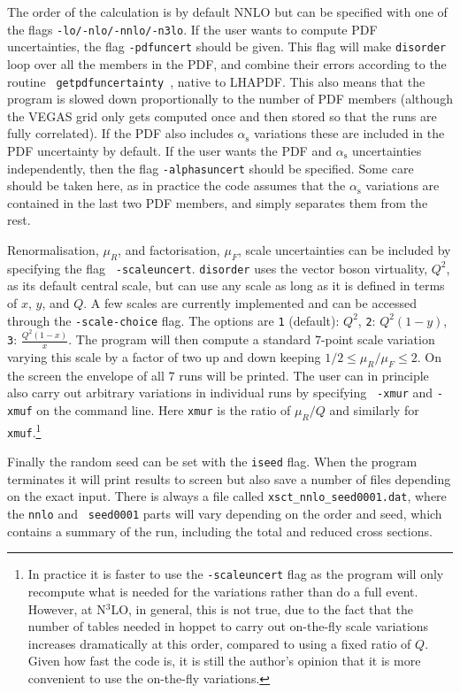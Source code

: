\documentclass[submission, PhysCodeb]{SciPost}
\newcommand{\hoppet}{{\sc hoppet}}
\newcommand{\disorder}{{\tt disorder}}
\newcommand{\as}{\alpha_{\mathrm{s}}}
\newcommand{\NNNLO}{N$^3$LO}
\begin{document}
The order of the calculation is by default NNLO but can be specified
with one of the flags {\tt -lo/-nlo/-nnlo/-n3lo}. If the user wants to
compute PDF uncertainties, the flag {\tt -pdfuncert} should be
given. This flag will make \disorder{} loop over all the members in
the PDF, and combine their errors according to the routine {\tt
  getpdfuncertainty}~\cite{Watt:2011kp}, native to LHAPDF. This also
means that the program is slowed down proportionally to the number of
PDF members (although the VEGAS grid only gets computed once and then
stored so that the runs are fully correlated). If the PDF also
includes $\as$ variations these are included in the PDF uncertainty by
default. If the user wants the PDF and $\as$ uncertainties
independently, then the flag {\tt -alphasuncert} should be
specified. Some care should be taken here, as in practice the code
assumes that the $\as$ variations are contained in the last two PDF
members, and simply separates them from the rest.

Renormalisation, $\mu_R$, and factorisation, $\mu_F$, scale
uncertainties can be included by specifying the flag {\tt
  -scaleuncert}. \disorder{} uses the vector boson virtuality, $Q^2$,
as its default central scale, but can use any scale as long as it is
defined in terms of $x$, $y$, and $Q$. A few scales are currently
implemented and can be accessed through the {\tt -scale-choice}
flag. The options are {\tt 1} (default): $Q^2$, {\tt 2}: $Q^2(1-y)$,
{\tt 3}: $\frac{Q^2(1-x)}{x}$. The program will then compute a
standard 7-point scale variation varying this scale by a factor of two
up and down keeping $1/2\le \mu_R/\mu_F\le 2$. On the screen the
envelope of all 7 runs will be printed. The user can in principle also
carry out arbitrary variations in individual runs by specifying {\tt
  -xmur} and {\tt -xmuf} on the command line. Here {\tt xmur} is the
ratio of $\mu_R/Q$ and similarly for {\tt xmuf}.\footnote{In practice
it is faster to use the {\tt -scaleuncert} flag as the program will
only recompute what is needed for the variations rather than do a full
event. However, at \NNNLO{}, in general, this is not true, due to the
fact that the number of tables needed in \hoppet{} to carry out
on-the-fly scale variations increases dramatically at this order,
compared to using a fixed ratio of $Q$. Given how fast the code is, it
is still the author's opinion that it is more convenient to use the
on-the-fly variations.}

Finally the random seed can be set with the {\tt iseed} flag. When the
program terminates it will print results to screen but also save a
number of files depending on the exact input. There is always a file
called {\tt xsct\_nnlo\_seed0001.dat}, where the {\tt nnlo} and {\tt
  seed0001} parts will vary depending on the order and seed, which
contains a summary of the run, including the total and reduced cross
sections. 
\end{document}
